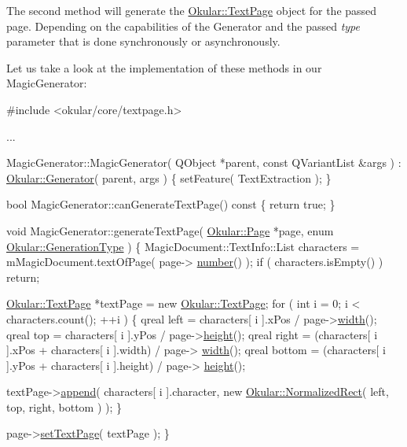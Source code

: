 The second method will generate the \hyperlink{classOkular_1_1TextPage}{Okular\+::\+Text\+Page} object for the passed page. Depending on the capabilities of the Generator and the passed {\itshape type} parameter that is done synchronously or asynchronously.

Let us take a look at the implementation of these methods in our Magic\+Generator\+:


\begin{DoxyCode}
\textcolor{preprocessor}{#include <okular/core/textpage.h>}

...

MagicGenerator::MagicGenerator( QObject *parent, \textcolor{keyword}{const} QVariantList &args )
    : \hyperlink{classOkular_1_1Generator}{Okular::Generator}( parent, args )
\{
    setFeature( TextExtraction );
\}

\textcolor{keywordtype}{bool} MagicGenerator::canGenerateTextPage()\textcolor{keyword}{ const}
\textcolor{keyword}{}\{
    \textcolor{keywordflow}{return} \textcolor{keyword}{true};
\}

\textcolor{keywordtype}{void} MagicGenerator::generateTextPage( \hyperlink{classOkular_1_1Page}{Okular::Page} *page, \textcolor{keyword}{enum} 
      \hyperlink{namespaceOkular_aefe2f23519d73b489219060219986007}{Okular::GenerationType} )
\{
    MagicDocument::TextInfo::List characters = mMagicDocument.textOfPage( page->
      \hyperlink{classOkular_1_1Page_a6eee5f157a130b47d81ddd63e501664b}{number}() );
    \textcolor{keywordflow}{if} ( characters.isEmpty() )
        \textcolor{keywordflow}{return};

    \hyperlink{classOkular_1_1TextPage}{Okular::TextPage} *textPage = \textcolor{keyword}{new} \hyperlink{classOkular_1_1TextPage}{Okular::TextPage};
    \textcolor{keywordflow}{for} ( \textcolor{keywordtype}{int} i = 0; i < characters.count(); ++i ) \{
        qreal left = characters[ i ].xPos / page->\hyperlink{classOkular_1_1Page_a57114e88281da2a51b1bb0d5d4996d53}{width}();
        qreal top = characters[ i ].yPos / page->\hyperlink{classOkular_1_1Page_a67246a32b3e625946eb5c685b8372a4f}{height}();
        qreal right = (characters[ i ].xPos + characters[ i ].width) / page->
      \hyperlink{classOkular_1_1Page_a57114e88281da2a51b1bb0d5d4996d53}{width}();
        qreal bottom = (characters[ i ].yPos + characters[ i ].height) / page->
      \hyperlink{classOkular_1_1Page_a67246a32b3e625946eb5c685b8372a4f}{height}();

        textPage->\hyperlink{classOkular_1_1TextPage_a003032e4e1cd8c15f01ed639ce62d11f}{append}( characters[ i ].character,
                          \textcolor{keyword}{new} \hyperlink{classOkular_1_1NormalizedRect}{Okular::NormalizedRect}( left, top, right, bottom ) );
    \}

    page->\hyperlink{classOkular_1_1Page_a2853c6369aa8ebe6b0593201ce9cf49e}{setTextPage}( textPage );
\}
\end{DoxyCode}


